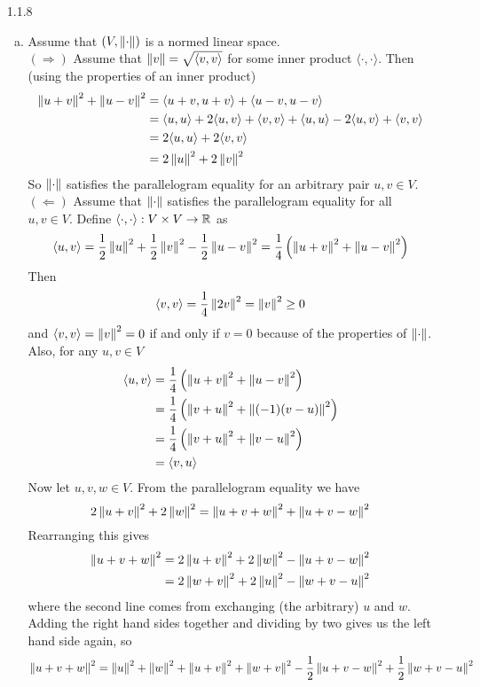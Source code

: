 \documentclass[../../Solutions.tex]{subfiles}
\begin{document}
\begin{itemize}
	\item [1.1.8]
	\begin{enumerate}[(a)]
		\item Assume that $(V,\left\lVert\cdot\right\rVert)$ is a normed linear space. \\
		$(\Rightarrow)$ Assume that $\left\lVert v\right\rVert = \sqrt{\langle v,v \rangle}$ for some inner product $\langle \cdot,\cdot \rangle$.
		Then (using the properties of an inner product)
		\begin{equation*} \begin{split}
			\left\lVert u+v\right\rVert^2+\left\lVert u-v\right\rVert^2 & = \langle u+v , u+v \rangle + \langle u-v,u-v \rangle \\
				& = \langle u,u \rangle + 2\langle u,v \rangle + \langle v,v \rangle + \langle u,u \rangle -2\langle u,v \rangle + \langle v,v \rangle \\
				& = 2\langle u,u \rangle + 2\langle v,v \rangle \\
				& = 2\left\lVert u\right\rVert^2+2\left\lVert v\right\rVert^2
		\end{split} \end{equation*}
		So $\left\lVert\cdot\right\rVert$ satisfies the parallelogram equality for an arbitrary pair $u,v \in V$. \\
		$(\Leftarrow)$ Assume that $\left\lVert\cdot\right\rVert$ satisfies the parallelogram equality for all $u,v \in V$.
		Define $\langle \cdot,\cdot \rangle: V\times V \to \mathbb{R}$ as
		$$ \langle u,v \rangle = \frac{1}{2}\left\lVert u\right\rVert^2+\frac{1}{2}\left\lVert v\right\rVert^2-\frac{1}{2}\left\lVert u-v\right\rVert^2 = \frac{1}{4}\left(\left\lVert u+v\right\rVert^2+\left\lVert u-v\right\rVert^2\right) $$
		Then
		$$ \langle v,v \rangle = \frac{1}{4}\left\lVert2v\right\rVert^2 = \left\lVert v\right\rVert^2 \geq 0 $$
		and $\langle v,v \rangle = \left\lVert v\right\rVert^2 = 0$ if and only if $v = 0$ because of the properties of $\left\lVert\cdot\right\rVert$.
		Also, for any $u,v \in V$
		\begin{equation*} \begin{split}
			\langle u,v \rangle & = \frac{1}{4}\left(\left\lVert u+v\right\rVert^2+\left\lVert u-v\right\rVert^2\right) \\
				& = \frac{1}{4}\left(\left\lVert v+u\right\rVert^2+\left\lVert(-1)(v-u)\right\rVert^2\right) \\
				& = \frac{1}{4}\left(\left\lVert v+u\right\rVert^2+\left\lVert v-u\right\rVert^2\right) \\
				& = \langle v,u \rangle
		\end{split} \end{equation*}
		Now let $u,v,w \in V$.
		From the parallelogram equality we have
		$$ 2\left\lVert u+v\right\rVert^2+2\left\lVert w\right\rVert^2 = \left\lVert u+v+w\right\rVert^2+\left\lVert u+v-w\right\rVert^2 $$
		Rearranging this gives
		\begin{equation*} \begin{split}
			\left\lVert u+v+w\right\rVert^2 & = 2\left\lVert u+v\right\rVert^2+2\left\lVert w\right\rVert^2-\left\lVert u+v-w\right\rVert^2 \\
				& = 2\left\lVert w+v\right\rVert^2+2\left\lVert u\right\rVert^2-\left\lVert w+v-u\right\rVert^2
		\end{split} \end{equation*}
		where the second line comes from exchanging (the arbitrary) $u$ and $w$.
		Adding the right hand sides together and dividing by two gives us the left hand side again, so
		$$ \left\lVert u+v+w\right\rVert^2 = \left\lVert u\right\rVert^2+\left\lVert w\right\rVert^2+\left\lVert u+v\right\rVert^2+\left\lVert w+v\right\rVert^2-\frac{1}{2}\left\lVert u+v-w\right\rVert^2+\frac{1}{2}\left\lVert w+v-u\right\rVert^2 $$
	\end{enumerate}
	

\end{itemize}
\end{document}
